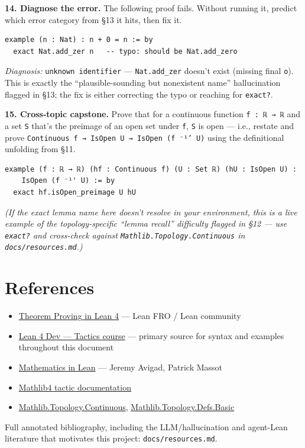 \textbf{14. Diagnose the error.} The following proof fails. Without running it, predict which error category from \S13 it hits, then fix it.

\begin{verbatim}
example (n : Nat) : n + 0 = n := by
  exact Nat.add_zer n   -- typo: should be Nat.add_zero
\end{verbatim}

\emph{Diagnosis:} \texttt{unknown identifier} --- \texttt{Nat.add\_zer} doesn't exist (missing final \texttt{o}). This is exactly the ``plausible-sounding but nonexistent name'' hallucination flagged in \S13; the fix is either correcting the typo or reaching for \texttt{exact?}.

\textbf{15. Cross-topic capstone.} Prove that for a continuous function \texttt{f : ℝ → ℝ} and a set \texttt{S} that's the preimage of an open set under \texttt{f}, \texttt{S} is open --- i.e., restate and prove \texttt{Continuous f → IsOpen U → IsOpen (f ⁻¹' U)} using the definitional unfolding from \S11.

\begin{verbatim}
example (f : ℝ → ℝ) (hf : Continuous f) (U : Set ℝ) (hU : IsOpen U) :
    IsOpen (f ⁻¹' U) := by
  exact hf.isOpen_preimage U hU
\end{verbatim}

\emph{(If the exact lemma name here doesn't resolve in your environment, this is a live example of the topology-specific ``lemma recall'' difficulty flagged in \S12 --- use \texttt{exact?} and cross-check against \texttt{Mathlib.Topology.Continuous} in \texttt{docs/resources.md}.)}

\section{References}

\begin{itemize}
  \item \href{https://leanprover.github.io/theorem_proving_in_lean4/}{Theorem Proving in Lean 4} --- Lean FRO / Lean community
  \item \href{https://lean4.dev/tactics}{Lean 4 Dev --- Tactics course} --- primary source for syntax and examples throughout this document
  \item \href{https://leanprover-community.github.io/mathematics_in_lean/}{Mathematics in Lean} --- Jeremy Avigad, Patrick Massot
  \item \href{https://leanprover-community.github.io/mathlib4_docs/tactics.html}{Mathlib4 tactic documentation}
  \item \href{https://leanprover-community.github.io/mathlib4_docs/Mathlib/Topology/Continuous.html}{Mathlib.Topology.Continuous}, \href{https://leanprover-community.github.io/mathlib4_docs/Mathlib/Topology/Defs/Basic.html}{Mathlib.Topology.Defs.Basic}
\end{itemize}

Full annotated bibliography, including the LLM/hallucination and agent-Lean literature that motivates this project: \texttt{docs/resources.md}.

